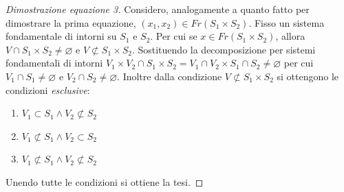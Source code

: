 \begin{proof}[Dimostrazione equazione 3]
	Considero, analogamente a quanto fatto per dimostrare la prima equazione, $(x_1,x_2) \in Fr(S_1 \times S_2)$. Fisso un sistema fondamentale di intorni su $S_1$ e $S_2$. Per cui se $x \in Fr(S_1 \times S_2)$, allora $V \cap S_1 \times S_2\neq \varnothing$ e $V \not\subset S_1 \times S_2$. Sostituendo la decomposizione per sistemi fondamentali di intorni $V_1 \times V_2 \cap S_1 \times S_2 = V_1 \cap V_2 \times S_1 \cap S_2\neq \varnothing$ per cui $V_1 \cap S_1 \neq \varnothing$ e $V_2 \cap S_2 \neq \varnothing$. Inoltre dalla condizione $V \not\subset S_1 \times S_2$ si ottengono le condizioni \textit{esclusive}:
	\begin{enumerate}
		\item $V_1 \subset S_1 \land V_2 \not\subset S_2$
		\item $V_1 \not\subset S_1 \land V_2 \subset S_2$
		\item $V_1 \not\subset S_1 \land V_2 \not\subset S_2$
	\end{enumerate}
	Unendo tutte le condizioni si ottiene la tesi. 
\end{proof}

